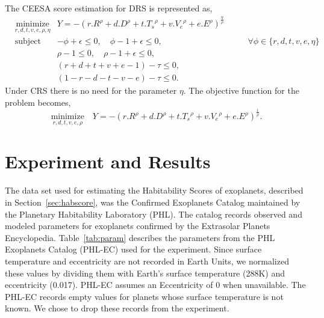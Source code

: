 \documentclass[9pt]{article}
\begin{document}
The CEESA score estimation for DRS is represented as,
\begin{equation}\label{eq:ceesadrs}
  \begin{aligned}
    & \underset{r,d,t,v,e,\rho,\eta}{\text{minimize}}
    & Y = {-}{(r.R^\rho+d.D^\rho+t.{T_s}^\rho+v.{V_e}^\rho+e.E^\rho)}^{\frac{\eta}{\rho}}\\
    & \text{subject to}
    &   {-}\phi + \epsilon \leq 0,\quad\phi - 1 + \epsilon \leq 0, &\quad\quad \forall \phi\in\{r,d,t,v,e,\eta\}\\
    && \rho - 1 \leq 0,\quad \rho - 1 + \epsilon \leq 0,\\
    && (r+d+t+v+e-1) - \tau \leq 0,\\
    && (1-r-d-t-v-e) - \tau \leq 0.
  \end{aligned}
\end{equation}
Under CRS there is no need for the parameter $\eta$. The objective function for the problem becomes,
\begin{equation}\label{eq:ceesacrs}
  \underset{r,d,t,v,e,\rho}{\text{minimize}}\quad
  Y = {-}{(r.R^\rho+d.D^\rho+t.{T_s}^\rho+v.{V_e}^\rho+e.E^\rho)}^{\frac{1}{\rho}}.
\end{equation}


\section{Experiment and Results}\label{sec:results}

The data set used for estimating the Habitability Scores of exoplanets, described in Section~\ref{sec:habscore}, was the
Confirmed Exoplanets Catalog maintained by the Planetary Habitability Laboratory (PHL). The catalog records observed and
modeled parameters for exoplanets confirmed by the Extrasolar Planets Encyclopedia. Table~\ref{tab:param} describes the
parameters from the PHL Exoplanets Catalog (PHL-EC) used for the experiment. Since surface temperature and eccentricity
are not recorded in Earth Units, we normalized these values by dividing them with Earth's surface temperature (288K) and
eccentricity (0.017). PHL-EC assumes an Eccentricity of 0 when unavailable. The PHL-EC records empty values for planets
whose surface temperature is not known. We chose to drop these records from the experiment.
\end{document}
